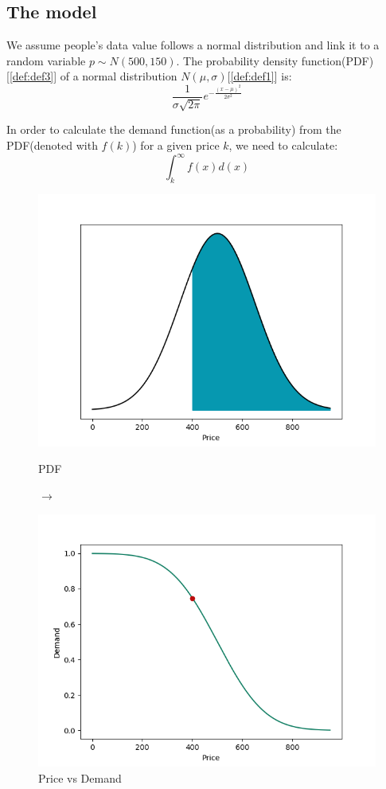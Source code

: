 \documentclass[11pt, a4paper]{article}
\begin{document}
	\subsection{The model}
		We assume people's data value follows a normal distribution and link it to a random variable $p\sim N(500, 150)$. The probability density function(PDF)[\ref{def:def3}] of a normal distribution $N(\mu, \sigma)$[\ref{def:def1}] is: $$\frac{1}{\sigma\sqrt{2\pi}}e^{-\frac{(x-\mu)^{2}}{2\sigma^{2}}}$$\par\noindent
		In order to calculate the demand function(as a probability) from the PDF(denoted with $f(k)$) for a given price $k$, we need to calculate:
		$$\int_{k}^{\infty}f(x)d(x)$$
		\begin{figure}[H]
			\begin{minipage}{0.48\textwidth}
				\centering
				\includegraphics[width=\linewidth]{ND_integral}
				\caption{PDF}\label{Fig:Data1}
			\end{minipage}$\longrightarrow$
			\begin{minipage}{0.48\textwidth}
				\centering
				\includegraphics[width=\linewidth]{Sample_point}
				\caption{Price vs Demand}\label{Fig:Data2}
			\end{minipage}
		\end{figure}\par\noindent
\end{document}
